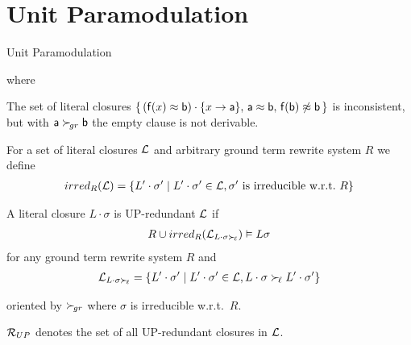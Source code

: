 \documentclass[%
]{beamer}
\begin{document}
\section{Unit Paramodulation}
\begin{frame}{Unit Paramodulation}

    \begin{definition}
    
    where
    
    \end{definition}

    \vspace{0.7em}
    \begin{remark}
    The set of literal closures
    $\{\,
    (\mathsf{f}(x)\approx\mathsf{b})\cdot\{x\to\mathsf{a}\},\, 
    \mathsf{a}\approx \mathsf{b},\,
    \mathsf{f}(\mathsf{b})\not\approx\mathsf{b}\,
    \}$ is inconsistent,
    but 
    with $\mathsf{a}\mathrel\succ_{\!gr}\mathsf{b}$ 
    the empty clause is not derivable.
    \end{remark}
    
    
\end{frame}



\begin{frame}[allowframebreaks]
    
    \begin{definition}
        
        For a set of literal closures $\mathcal{L}$ and 
        arbitrary ground term rewrite system $R$ we define
        \begin{gather*}
            irred_R(\mathcal{L}) = \{
                L'\cdot\sigma' \mid
                L'\cdot\sigma'\in\mathcal{L},
                \sigma'\text{ is irreducible w.r.t.~}R
            \}
        \end{gather*}
    
    A literal closure $L\cdot\sigma$ is UP-redundant $\mathcal{L}$ if
    \begin{gather*}
    R \cup irred_R(\mathcal{L}_{L\cdot\sigma\mathrel\succ_{\!\ell}}) \vDash L\sigma
    \end{gather*}
    for any ground term rewrite system $R$ and 
    \begin{gather*}
        \mathcal{L}_{L\cdot\sigma\mathrel\succ_{\!\ell}} = \{
            L'\cdot\sigma' \mid
            L'\cdot\sigma'\in\mathcal{L},
            L\cdot\sigma\mathrel\succ_{\!\ell} L'\cdot\sigma'
        \}
    \end{gather*}

    oriented by $\mathrel\succ_{\!gr}$ where $\sigma$ is irreducible w.r.t.~$R$.
    \vspace{0.7em}

    $\mathcal{R}_{UP}$ denotes the set of all UP-redundant closures in $\mathcal{L}$.






\end{definition}
\end{frame}
\end{document}
